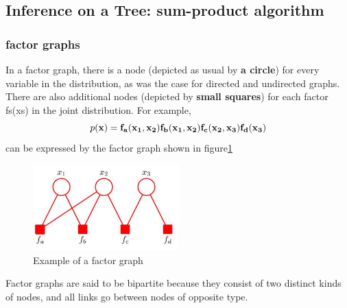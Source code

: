 \documentclass{article}
\begin{document}
\subsection{Inference on a Tree: sum-product algorithm}
\subsubsection*{factor graphs}
In a factor graph, there is a node (depicted as usual by \textbf{a circle}) for every variable
in the distribution, as was the case for directed and undirected graphs. There are also
additional nodes (depicted by \textbf{small squares}) for each factor fs(xs) in the joint distribution.\newline
For example,
\begin{equation}\label{eq8.21}
  p(\bf{x}) = f_a(x_1,x_2)f_b(x_1,x_2)f_c(x_2,x_3)f_d(x_3)
\end{equation}
can be expressed by the factor graph shown in figure\ref{GM5}
\begin{figure}
  \centering
  \includegraphics[width=0.5\textwidth]{./figures/GM5.jpg}
  \caption{Example of a factor graph}\label{GM5}
\end{figure}
Factor graphs are said to be bipartite because they consist of two distinct kinds
of nodes, and all links go between nodes of opposite type.
\end{document}
